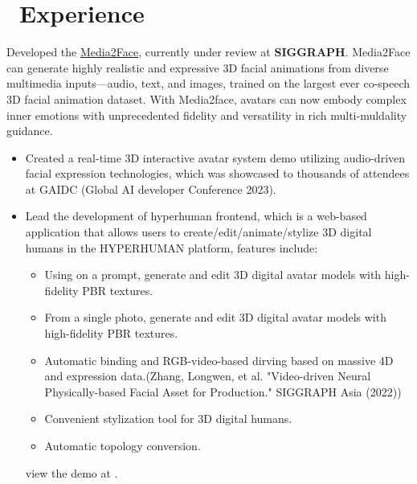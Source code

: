 \documentclass{resume}
\begin{document}
\section{\faUsers\ Experience}


Developed the \href{https://sites.google.com/view/media2face}{Media2Face}, currently under review at \textbf{SIGGRAPH}. Media2Face can generate highly realistic and expressive 3D facial animations from diverse multimedia inputs—audio, text, and images, trained on the largest ever co-speech 3D facial animation dataset. With Media2face, avatars can now embody complex inner emotions with unprecedented fidelity and versatility in rich multi-muldality guidance.


\begin{itemize}
  \item Created a real-time 3D interactive avatar system demo utilizing audio-driven facial expression technologies, which was showcased to thousands of attendees at GAIDC (Global AI developer Conference 2023).
  \item Lead the development of hyperhuman frontend, which is a web-based application that allows users to create/edit/animate/stylize 3D digital humans in the HYPERHUMAN platform, features include:
        \begin{itemize}
          \item Using on a prompt, generate and edit 3D digital avatar models with high-fidelity PBR textures.
          \item From a single photo, generate and edit 3D digital avatar models with high-fidelity PBR textures.
          \item Automatic binding and RGB-video-based dirving based on massive 4D and expression data.(Zhang, Longwen, et al. "Video-driven Neural Physically-based Facial Asset for Production." SIGGRAPH Asia (2022))
          \item Convenient stylization tool for 3D digital humans.
          \item Automatic topology conversion.
        \end{itemize}
        view the demo at .
\end{itemize}
\end{document}
